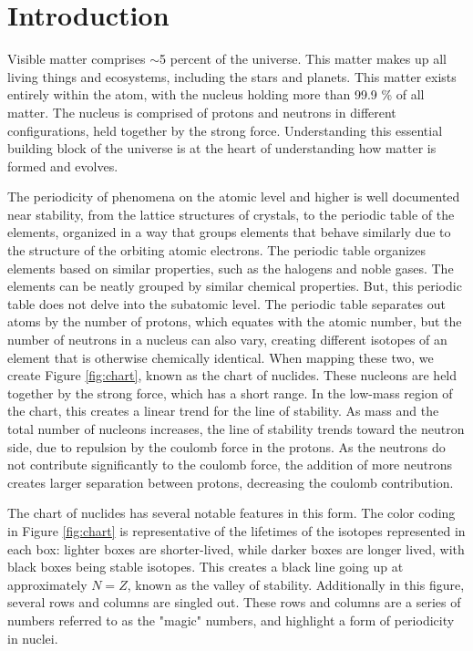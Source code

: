 %
%

\chapter{Introduction}

Visible matter comprises $\sim$5 percent of the universe. This matter makes up all living things and ecosystems, including the stars and planets. This matter exists entirely within the atom, with the nucleus holding more than 99.9 \% of all matter. The nucleus is comprised of protons and neutrons in different configurations, held together by the strong force. Understanding this essential building block of the universe is at the heart of understanding how matter is formed and evolves.

The periodicity of phenomena on the atomic level and higher is well documented near stability, from the lattice structures of crystals, to the periodic table of the elements, organized in a way that groups elements that behave similarly due to the structure of the orbiting atomic electrons. The periodic table organizes elements based on similar properties, such as the halogens and noble gases. The elements can be neatly grouped by similar chemical properties. But, this periodic table does not delve into the subatomic level. The periodic table separates out atoms by the number of protons, which equates with the atomic number, but the number of neutrons in a nucleus can also vary, creating different isotopes of an element that is otherwise chemically identical. When mapping these two, we create Figure \ref{fig:chart}, known as the chart of nuclides. These nucleons are held together by the strong force, which has a short range. In the low-mass region of the chart, this creates a linear trend for the line of stability. As mass and the total number of nucleons increases, the line of stability trends toward the neutron side, due to repulsion by the coulomb force in the protons. As the neutrons do not contribute significantly to the coulomb force, the addition of more neutrons creates larger separation between protons, decreasing the coulomb contribution.



The chart of nuclides has several notable features in this form. The color coding in Figure \ref{fig:chart} is representative of the lifetimes of the isotopes represented in each box: lighter boxes are shorter-lived, while darker boxes are longer lived, with black boxes being stable isotopes. This creates a black line going up at approximately $N=Z$, known as the valley of stability. Additionally in this figure, several rows and columns are singled out. These rows and columns are a series of numbers referred to as the "magic" numbers, and highlight a form of periodicity in nuclei. 

